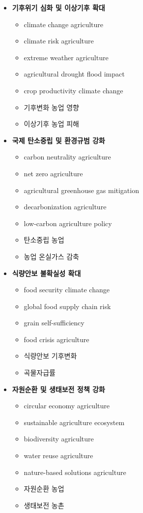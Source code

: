\begin{itemize}

    \item \textbf{기후위기 심화 및 이상기후 확대}
    \begin{itemize}
        \item climate change agriculture
        \item climate risk agriculture
        \item extreme weather agriculture
        \item agricultural drought flood impact
        \item crop productivity climate change
        \item 기후변화 농업 영향
        \item 이상기후 농업 피해
    \end{itemize}

    \item \textbf{국제 탄소중립 및 환경규범 강화}
    \begin{itemize}
        \item carbon neutrality agriculture
        \item net zero agriculture
        \item agricultural greenhouse gas mitigation
        \item decarbonization agriculture
        \item low-carbon agriculture policy
        \item 탄소중립 농업
        \item 농업 온실가스 감축
    \end{itemize}

    \item \textbf{식량안보 불확실성 확대}
    \begin{itemize}
        \item food security climate change
        \item global food supply chain risk
        \item grain self-sufficiency
        \item food crisis agriculture
        \item 식량안보 기후변화
        \item 곡물자급률
    \end{itemize}

    \item \textbf{자원순환 및 생태보전 정책 강화}
    \begin{itemize}
        \item circular economy agriculture
        \item sustainable agriculture ecosystem
        \item biodiversity agriculture
        \item water reuse agriculture
        \item nature-based solutions agriculture
        \item 자원순환 농업
        \item 생태보전 농촌
    \end{itemize}

\end{itemize}

